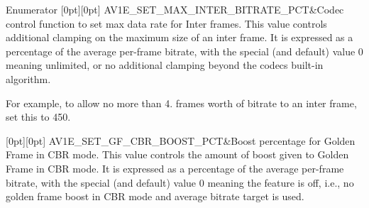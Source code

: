 \begin{DoxyEnumFields}{Enumerator}
[0pt][0pt]{}\mbox{\label{group__aom__encoder_ggae78dde67a6d78f332e9bdba0dde42db5a54b7c950e51f39a3cb7344a2665b9929}} 
A\+V1\+E\+\_\+\+S\+E\+T\+\_\+\+M\+A\+X\+\_\+\+I\+N\+T\+E\+R\+\_\+\+B\+I\+T\+R\+A\+T\+E\+\_\+\+P\+CT&Codec control function to set max data rate for Inter frames. This value controls additional clamping on the maximum size of an inter frame. It is expressed as a percentage of the average per-\/frame bitrate, with the special (and default) value 0 meaning unlimited, or no additional clamping beyond the codec\textquotesingle{}s built-\/in algorithm.

For example, to allow no more than 4. frames worth of bitrate to an inter frame, set this to 450. \\
\hline

[0pt][0pt]{}\mbox{\label{group__aom__encoder_ggae78dde67a6d78f332e9bdba0dde42db5ade327180f01d27d22abd94c1f0a8bc9e}} 
A\+V1\+E\+\_\+\+S\+E\+T\+\_\+\+G\+F\+\_\+\+C\+B\+R\+\_\+\+B\+O\+O\+S\+T\+\_\+\+P\+CT&Boost percentage for Golden Frame in C\+BR mode. This value controls the amount of boost given to Golden Frame in C\+BR mode. It is expressed as a percentage of the average per-\/frame bitrate, with the special (and default) value 0 meaning the feature is off, i.\+e., no golden frame boost in C\+BR mode and average bitrate target is used.


\end{DoxyEnumFields}

